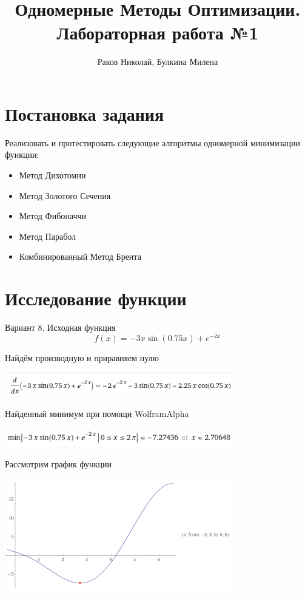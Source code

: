 \documentclass[a4paper,12pt]{article}
\title{Одномерные Методы Оптимизации. Лабораторная работа №1}
\author{Раков Николай, Булкина Милена}
\date{}
\begin{document}
\maketitle
\clearpage

\section{Постановка задания}

Реализовать и протестировать следующие алгоритмы одномерной минимизации функции:

\begin{itemize}
\item Метод Дихотомии
\item Метод Золотого Сечения
\item Метод Фибоначчи
\item Метод Парабол
\item Комбинированный Метод Брента
\end{itemize}

\section{Исследование функции}

Вариант 8. Исходная функция
\begin{equation*}
    f(x)=-3x\sin(0.75x)+e^{-2x}
\end{equation*}

Найдём производную и приравняем нулю

\includegraphics[width=100mm]{wa3.PNG}

Найденный минимум при помощи WolframAlpha

\includegraphics[width=100mm]{wa1.PNG}

Рассмотрим график функции

\includegraphics[width=100mm]{wa2.PNG}
\end{document}
